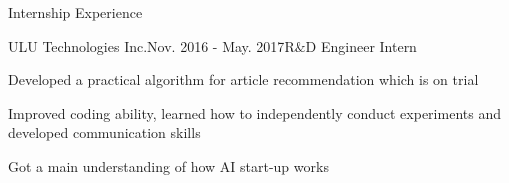 \documentclass{resume} %
\begin{document}
\begin{comment}
\begin{rSubsection}{Large-Scale WEB Vulnerability Detection by Supervised Learning}{Oct. 2014 - June. 2015}{}{}
\item Developed an algorithm to detect malicious URLs from Shanghai Telecomm 120 gigabytes web log.
\item Extracted information including Whois, IP connection and URLs to form feature vectors.
\item Trained multiclass-SVM to classify benign or malicious URLs based on labels obtained from Google Safe Browsing API and achieved 86\% accuracy.
\end{rSubsection}

\begin{rSubsection}{Vehicle WLAN Based Car Sharing Platform}{Mar. 2014 - Dec. 2014}{}{}
\item Designed a car sharing system in 3-person team with vehicle based hardware, Android APP and web platform to improve efficiency of car rental service. 
\item Enrolled in Fourth Shanghai College Innovation \& Entrepreneurship Forum (3/300 selected from SJTU).
\item Patented in China : CN104836860 A
\end{rSubsection}

\end{rSection}
\vspace{0.5em}
\end{comment}
\begin{rSection}{Internship Experience}
\begin{rSubsection}{ULU Technologies Inc.}{Nov. 2016 - May. 2017}{R$\&$D  Engineer Intern}{}
\item Developed a practical algorithm for article recommendation which is on trial
\item Improved coding ability, learned how to independently conduct experiments and developed communication skills
\item Got a main understanding of how AI start-up works
\end{rSubsection}
\end{rSection}
\end{document}
